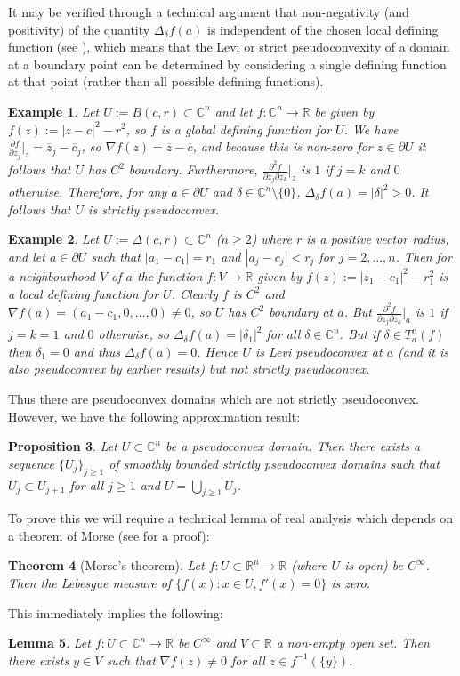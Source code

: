 \documentclass[11pt,a4paper, final, twoside]{article}
\newtheorem{theorem}{Theorem}
\newtheorem{example}[theorem]{Example}
\newtheorem{lemma}[theorem]{Lemma}
\newtheorem{proposition}[theorem]{Proposition}
\numberwithin{equation}{section}
\newcommand{\C}{\mathbb C}
\newcommand{\R}{\mathbb R}
\newcommand{\con}[1]{\overline{#1}}
\newcommand{\clos}[1]{\overline{#1}}
\newcommand{\bd}{\partial}
\newcommand{\ball}{B}
\newcommand{\pdisc}{\Delta}
\newcommand{\cts}{C}
\newcommand{\grad}[1]{#1'}
\newcommand{\cgrad}[1]{\nabla #1}
\begin{document}
It may be verified through a technical argument that non-negativity (and positivity) of the quantity $\Delta_\delta f(a)$ is independent of the chosen local defining function (see \cite[page 56]{range}),
which means that the Levi or strict pseudoconvexity of a domain at a boundary point can be determined by considering a single defining function
at that point (rather than all possible defining functions).
\begin{example}
Let $U:=\ball(c,r)\subset\C^n$ and let $f\colon\C^n\to\R$ be given by $f(z):=|z-c|^2-r^2$, so $f$ is a global defining function for $U$. We have
$ \frac{\partial f}{\partial z_j}\big|_z=\con z_j-\con c_j$, so $\cgrad{f}(z)=\con{z}-\con{c}$, and because this is non-zero for $z\in\bd U$ it follows that $U$ has $\cts^2$ boundary.
Furthermore, $\frac{\partial^2 f}{\partial z_j\partial\con z_k}\big|_z$ is $1$ if $j=k$ and $0$ otherwise. Therefore, for any
$a\in\bd U$ and $\delta\in\C^n\setminus\{0\}$, $\Delta_\delta f(a)=|\delta|^2>0$. It follows that $U$ is strictly pseudoconvex.
\end{example}
\begin{example}
Let $U:=\pdisc(c,r)\subset\C^n$ ($n\geq 2$) where $r$ is a positive vector radius, and let $a\in\bd U$ such that $|a_1-c_1|=r_1$ and $|a_j-c_j|<r_j$ for $j=2,\dots,n$. Then
for a neighbourhood $V$ of $a$ the function $f\colon V\to\R$ given by $f(z):=|z_1-c_1|^2-r_1^2$ is a local defining function for $U$. Clearly $f$ is $\cts^2$ and $\cgrad{f}(a)=(\con a_1-\con c_1,0,\dots,0)\neq 0$,
so $U$ has $\cts^2$ boundary at $a$. But $\frac{\partial^2 f}{\partial z_j\partial\con z_k}\big|_a$ is $1$ if $j=k=1$ and $0$ otherwise, so $\Delta_\delta f(a)=|\delta_1|^2$ for all $\delta\in\C^n$.
But if $\delta\in T^c_a(f)$ then $\delta_1=0$ and thus $\Delta_\delta f(a)=0$. Hence $U$ is Levi pseudoconvex at $a$ (and it is also pseudoconvex by earlier results) but not strictly pseudoconvex.
\end{example}
Thus there are pseudoconvex domains which are not strictly pseudoconvex. However, we have the following approximation result:
\begin{proposition}
\label{slpapprox}
Let $U\subset\C^n$ be a pseudoconvex domain. Then there exists a sequence $\{U_j\}_{j\geq 1}$ of smoothly bounded 
strictly pseudoconvex domains 
such that $\clos{U_j}\subset U_{j+1}$ for all $j\geq 1$
and $U=\bigcup_{j\geq 1}U_j$.
\end{proposition}
To prove this we will require a technical lemma of real analysis which depends on a theorem of Morse (see \cite{morse} for a proof):
\begin{theorem}[Morse's theorem]
Let $f\colon U\subset\R^n\to\R$ (where $U$ is open) be $\cts^\infty$. Then the Lebesgue measure of $\{f(x)\colon x\in U,\grad{f}(x)=0\}$ is zero.
\end{theorem}
This immediately implies the following:
\begin{lemma}
\label{morselemma}
Let $f\colon U\subset\C^n\to\R$ be $\cts^\infty$ and $V\subset\R$ a non-empty open set. Then there exists $y\in V$ such that $\cgrad{f}(z)\neq 0$ for all $z\in f^{-1}(\{y\})$.
\end{lemma}
\end{document}
